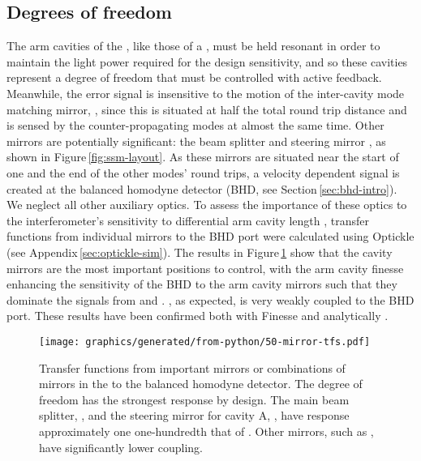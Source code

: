 \subsection{\label{sec:ssm-dofs}Degrees of freedom}
The arm cavities of the \SSM{}, like those of a \FPMI{}, must be held resonant in order to maintain the light power required for the design sensitivity, and so these cavities represent a degree of freedom that must be controlled with active feedback. Meanwhile, the error signal is insensitive to the motion of the inter-cavity mode matching mirror, \MNINE{}, since this is situated at half the total round trip distance and is sensed by the counter-propagating modes at almost the same time. Other mirrors are potentially significant: the beam splitter \MSIX{} and steering mirror \MSEVEN{}, as shown in Figure\,\ref{fig:ssm-layout}. As these mirrors are situated near the start of one and the end of the other modes' round trips, a velocity dependent signal is created at the balanced homodyne detector (\gls{BHD}, see Section\,\ref{sec:bhd-intro}). We neglect all other auxiliary optics. To assess the importance of these optics to the interferometer's sensitivity to differential arm cavity length \LMINUS{}, transfer functions from individual mirrors to the \gls{BHD} port were calculated using Optickle (see Appendix\,\ref{sec:optickle-sim}). The results in Figure\,\ref{fig:ssm-mirror-tfs} show that the cavity mirrors are the most important positions to control, with the arm cavity finesse enhancing the sensitivity of the \gls{BHD} to the arm cavity mirrors such that they dominate the signals from \MSIX{} and \MSEVEN{}. \MNINE{}, as expected, is very weakly coupled to the \gls{BHD} port. These results have been confirmed both with Finesse and analytically \cite{Glaefke2015}.

\begin{figure}
  \centering
  \texttt{[image: graphics/generated/from-python/50-mirror-tfs.pdf]}
  \caption[Transfer functions from important mirrors/combinations of mirrors in the \SSMEXPT{} to the balanced homodyne detector]{\label{fig:ssm-mirror-tfs}Transfer functions from important mirrors or combinations of mirrors in the \SSMEXPT{} to the balanced homodyne detector. The \LMINUS{} degree of freedom has the strongest response by design. The main beam splitter, \MSIX{}, and the steering mirror for cavity A, \MSEVEN{}, have response approximately one one-hundredth that of \LMINUS{}. Other mirrors, such as \MNINE{}, have significantly lower coupling.}
\end{figure}

